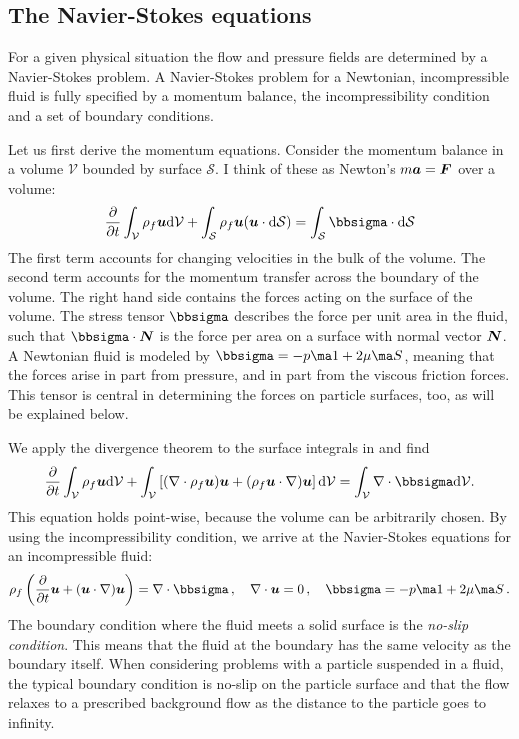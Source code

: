 \documentclass[thesis.tex]{subfiles}
\begin{document}
\subsection{The Navier-Stokes equations}

For a given physical situation the flow and pressure fields are determined by a Navier-Stokes problem.
A Navier-Stokes problem for a Newtonian, incompressible fluid is fully specified by a momentum balance, the incompressibility condition and a set of boundary conditions.

Let us first derive the momentum equations. Consider the momentum balance in a volume $\mathcal V$ bounded by surface $\mathcal S$. I think of these as Newton's $m \mbox{\boldmath$a$} = \mbox{\boldmath$F$}$ over a volume:
\begin{align}
    \pdiff{}{t}\int_\mathcal V  \rho_f \ve u \rd\mathcal V +
    \int_\mathcal S \rho_f\ve u (\ve u \cdot \rd \mathcal S) =
    \int_\mathcal S \bbsigma \cdot \rd \mathcal S \eqnlab{nsderiv1}
\end{align}
The first term accounts for changing velocities in the bulk of the volume. The second term accounts for the momentum transfer across the boundary of the volume. The right hand side contains the forces acting on the surface of the volume. The stress tensor $\bbsigma$ describes the force per unit area in the fluid, such that $\bbsigma\cdot \ve N$ is the force per area on a surface with normal vector $\mbox{\boldmath$N$}$. A Newtonian fluid is modeled by $\bbsigma = -p \ma 1 + 2\mu \ma S$, meaning that the forces arise in part from pressure, and in part from the viscous friction forces. This tensor is central in determining the forces on particle surfaces, too, as will be explained below.

We apply the divergence theorem to the surface integrals in  and find
\begin{align}
    \pdiff{}{t}\int_\mathcal V  \rho_f \ve u \rd\mathcal V +
    \int_\mathcal V  \left[(\nabla\cdot\rho_f\ve u) \ve u+(\rho_f\ve u\cdot\nabla) \ve u\right] \rd \mathcal V =
    \int_\mathcal V \nabla\cdot\bbsigma \rd \mathcal V.
\end{align}
This equation holds point-wise, because the volume can be arbitrarily chosen. By using the incompressibility condition, we arrive at the Navier-Stokes equations for an incompressible fluid:
\begin{align}\eqnlab{nsintro}
    \rho_f \left(\pdiff{}{t}\ve u + (\ve u \cdot \nabla) \ve u\right)=\nabla \cdot \bbsigma\,,\quad \nabla \cdot \ve u = 0\,,\quad \bbsigma = -p \ma 1 + 2\mu \ma S\,.
\end{align}
The boundary condition where the fluid meets a solid surface is the \emph{no-slip condition}. This means that the fluid at the boundary has the same velocity as the boundary itself. When considering problems with a particle suspended in a fluid, the typical boundary condition is no-slip on the particle surface and that the flow relaxes to a prescribed background flow as the distance to the particle goes to infinity. 
\end{document}
